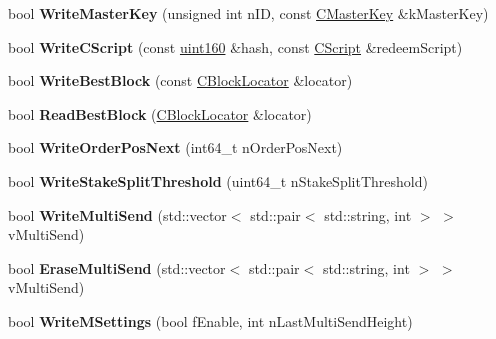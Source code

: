 \begin{DoxyCompactItemize}
bool {\bfseries Write\+Master\+Key} (unsigned int n\+ID, const \mbox{\hyperlink{class_c_master_key}{C\+Master\+Key}} \&k\+Master\+Key)
\item 
\mbox{\label{class_c_wallet_d_b_a8c69e48e2305775898658e0a4f4616c9}} 
bool {\bfseries Write\+C\+Script} (const \mbox{\hyperlink{classuint160}{uint160}} \&hash, const \mbox{\hyperlink{class_c_script}{C\+Script}} \&redeem\+Script)
\item 
\mbox{\label{class_c_wallet_d_b_a5660d366fee16ab81f3e7d3a97892486}} 
bool {\bfseries Write\+Best\+Block} (const \mbox{\hyperlink{class_c_block_locator}{C\+Block\+Locator}} \&locator)
\item 
\mbox{\label{class_c_wallet_d_b_a20eecdac6605607ff7cba2f55ec86f73}} 
bool {\bfseries Read\+Best\+Block} (\mbox{\hyperlink{class_c_block_locator}{C\+Block\+Locator}} \&locator)
\item 
\mbox{\label{class_c_wallet_d_b_a6a1f671e6376b38a1f73c8a023abdd38}} 
bool {\bfseries Write\+Order\+Pos\+Next} (int64\+\_\+t n\+Order\+Pos\+Next)
\item 
\mbox{\label{class_c_wallet_d_b_a30e68570809d41af56208bbb1af65ee1}} 
bool {\bfseries Write\+Stake\+Split\+Threshold} (uint64\+\_\+t n\+Stake\+Split\+Threshold)
\item 
\mbox{\label{class_c_wallet_d_b_a656f4a9f1b7c0466c794160356b3c2b4}} 
bool {\bfseries Write\+Multi\+Send} (std\+::vector$<$ std\+::pair$<$ std\+::string, int $>$ $>$ v\+Multi\+Send)
\item 
\mbox{\label{class_c_wallet_d_b_a55c05f8ca81afd32d055b5e2e51342e5}} 
bool {\bfseries Erase\+Multi\+Send} (std\+::vector$<$ std\+::pair$<$ std\+::string, int $>$ $>$ v\+Multi\+Send)
\item 
\mbox{\label{class_c_wallet_d_b_a10433d051303d96dea90752051e102ea}} 
bool {\bfseries Write\+M\+Settings} (bool f\+Enable, int n\+Last\+Multi\+Send\+Height)
\item 
\mbox{\label{class_c_wallet_d_b_a5f80cea3cf5f0e839819ed93ab1c696c}} 

\end{DoxyCompactItemize}
